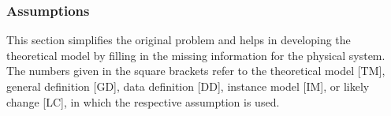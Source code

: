 \documentclass[12pt]{article}
\begin{document}
%
%
%
%
%
%

\subsubsection{Assumptions} \label{sec_assumpt}


This section simplifies the original problem and helps in developing the
theoretical model by filling in the missing information for the physical system.
The numbers given in the square brackets refer to the theoretical model [TM],
general definition [GD], data definition [DD], instance model [IM], or likely
change [LC], in which the respective assumption is used.
\end{document}
